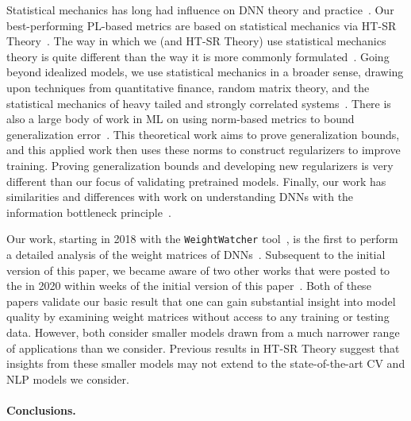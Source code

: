 Statistical mechanics has long had influence on DNN theory and practice~\cite{EB01_BOOK, MM17_TR, BKPx20}.
Our best-performing PL-based metrics are based on statistical mechanics via HT-SR Theory~\cite{MM17_TR, MM18_TR, MM19_HTSR_ICML, MM19_KDD, MM20_SDM}.
The way in which we (and HT-SR Theory) use statistical mechanics theory is quite different than the way it is more commonly formulated~\cite{EB01_BOOK, BKPx20}.
Going beyond idealized models, we use statistical mechanics in a broader sense, drawing upon techniques from quantitative finance, random matrix theory, and the statistical mechanics of heavy tailed and strongly correlated systems~\cite{BouchaudPotters03, SornetteBook, BP11, bun2017}.
There is also a large body of work in ML on using norm-based metrics to bound generalization error~\cite{NTS15, BFT17_TR, LMBx18_TR}.
This theoretical work aims to prove generalization bounds, and this applied work then uses these norms to construct regularizers to improve training.
Proving generalization bounds and developing new regularizers is very different than our focus of validating pretrained models.
Finally, our work has similarities and differences with work on understanding DNNs with the information bottleneck principle~\cite{TZ15,ST17_TR}.


Our work, starting in 2018 with the \texttt{WeightWatcher} tool~\cite{weightwatcher_package}, is the first to perform a detailed analysis of the weight matrices of DNNs~\cite{MM18_TR, MM19_HTSR_ICML, MM20_SDM}.
Subsequent to the initial version of this paper, we became aware of two other works that were posted to the in 2020 within weeks of the initial version of this paper~\cite{EJRUY20_TR,UKGBT20_TR}.
Both of these papers validate our basic result that one can gain substantial insight into model quality by examining weight matrices without access to any training or testing data.
However, both consider smaller models drawn from a much narrower range of applications than we consider.
Previous results in HT-SR Theory suggest that insights from these smaller models may not extend to the state-of-the-art CV and NLP models we consider.


\paragraph{Conclusions.}

